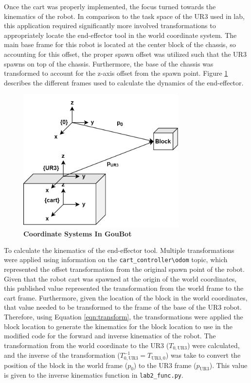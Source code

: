         Once the cart was properly implemented, the focus turned towards the kinematics of the robot. In comparison to the task space of the UR3 used in lab, this application required significantly more involved transformations to appropriately locate the end-effector tool in the world coordinate system. The main base frame for this robot is located at the center block of the chassis, so accounting for this offset, the proper spawn offset was utilized such that the UR3 spawns on top of the chassis. Furthermore, the base of the chassis was transformed to account for the z-axis offset from the spawn point. Figure \ref{fig:robotic_frame} describes the different frames used to calculate the dynamics of the end-effector.
        
        \begin{figure}[h]
        	\begin{center}
        	\includegraphics[width=0.75\textwidth]{pictures/transforms.png}
        	\caption{\textbf{Coordinate Systems In GouBot}}
        	\label{fig:robotic_frame}
        	\end{center}
        \end{figure}
        
        To calculate the kinematics of the end-effector tool. Multiple transformations were applied using information on the \lstinline!cart_controller\odom! topic, which represented the offset transformation from the original spawn point of the robot. Given that the robot cart was spawned at the origin of the world coordinates, this published value represented the transformation from the world frame to the cart frame. Furthermore, given the location of the block in the world coordinates, that value needed to be transformed to the frame of the base of the UR3 robot. Therefore, using Equation \ref{eqn:transform}, the transformations were applied the block location to generate the kinematics for the block location to use in the modified code for the forward and inverse kinematics of the robot. The transformation from the world coordinate to the UR3 ($T_{0,\text{UR3}}$) were calculated, and the inverse of the transformation ($T_{0,\text{UR3}}^{-1} = T_{\text{UR3}, 0}$) was take to convert the position of the block in the world frame ($p_0$) to the UR3 frame ($p_{\text{UR3}}$). This value is given to the inverse kinematics function in \lstinline!lab2_func.py!.
        
